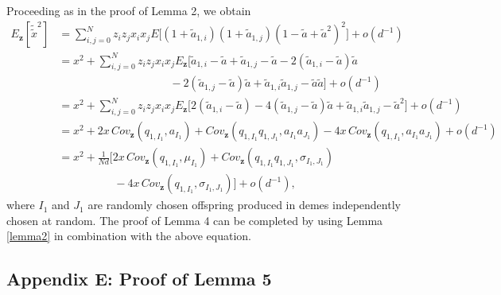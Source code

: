 \documentclass[11pt]{article}
\begin{document}
Proceeding as in the proof of Lemma 2, we obtain 
\begin{align}\label{sec2-eq24}
E_{\mathbf{z}}\left[\tilde{\tilde{x}}^2\right]
&=\sum_{i,j=0}^{N}z_iz_jx_ix_jE\Big[\left(1+\tilde{a}_{1,i}\right)\left(1+\tilde{a}_{1,j}\right)\left(1-\tilde{a}+\tilde{a}^2\right)^2\Big]+o(d^{-1})\nonumber\\
&=x^2+\sum_{i,j=0}^{N}z_iz_jx_ix_j
E_{\mathbf{z}}\Big[\tilde{a}_{1,i}-\tilde{a}+\tilde{a}_{1,j}-\tilde{a}-2\left(\tilde{a}_{1,i}-\tilde{a}\right)\tilde{a}\nonumber\\
&\quad\quad\quad\quad\quad\quad\quad\quad\quad\quad-2\left(\tilde{a}_{1,j}-\tilde{a}\right)\tilde{a}+\tilde{a}_{1,i}\tilde{a}_{1,j}-\tilde{a}\tilde{a}\Big]+o(d^{-1})\nonumber\\%
&=x^2+\sum_{i,j=0}^{N}z_iz_jx_ix_jE_{\mathbf{z}}\Big[2(\tilde{a}_{1,i}-\tilde{a})-
4(\tilde{a}_{1,j}-\tilde{a})\tilde{a}
+\tilde{a}_{1,i}\tilde{a}_{1,j}-\tilde{a}^2
\Big]+o(d^{-1})\nonumber\\
&=x^2+ 2x\,Cov_{\mathbf{z}}\left(q_{1,I_1},a_{I_1}\right)+Cov_{\mathbf{z}}\left(q_{1,I_1}q_{1,J_1},a_{I_1}a_{J_1}\right)-4x\,Cov_{\mathbf{z}}\left(q_{1,I_1},a_{I_1}a_{J_1}\right)+o(d^{-1})\nonumber\\
&=x^2+ \frac{1}{Nd}\Big[
2x\,Cov_{\mathbf{z}}\left(q_{1,I_1},\mu_{I_1}\right)+Cov_{\mathbf{z}}\left(q_{1,I_1}q_{1,J_1},\sigma_{I_1,J_1}\right)\nonumber\\
&\quad\quad\quad\quad\quad-4x\,Cov_{\mathbf{z}}\left(q_{1,I_1},\sigma_{I_1,J_1}\right)\Big]+o\left(d^{-1}\right),
\end{align}
where $I_1$ and $J_1$ are randomly chosen offspring produced in demes independently chosen at random.
The proof of Lemma 4 can be completed by using Lemma \ref{lemma2} in combination with the above equation.

\subsection*{Appendix E: Proof of Lemma 5  }
\end{document}

